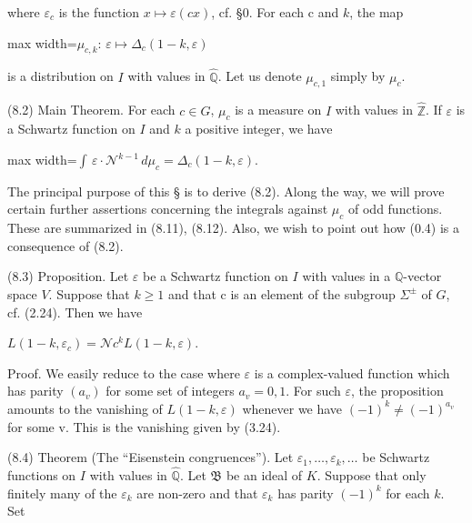 \documentclass[11pt]{article}
\newcommand{\DFormula}[1]{\par\smallskip\noindent\begin{adjustbox}{max width=\linewidth}$\displaystyle #1$\end{adjustbox}\par\smallskip}
\begin{document}
\par
where \(\varepsilon _{c}\) is the function \(x\mapsto \varepsilon (cx)\), cf. §0. For each c and \(k\), the map\par
\par
\DFormula{\mu _{c,k}:\,\varepsilon \mapsto \Delta _{c}(1-k,\varepsilon )}
\par
is a distribution on \(I\) with values in \(\widehat{\mathbb{Q}}\). Let us denote \(\mu _{c,1}\) simply by \(\mu _{c}\).\par
\par
(8.2) Main Theorem. For each \(c\in G\), \(\mu _{c}\) is a measure on \(I\) with values in \(\widehat{\mathbb{Z}}\). If \(\varepsilon \) is a Schwartz function on \(I\) and \(k\) a positive integer, we have\par
\par
\DFormula{\int \,\varepsilon \cdot \mathcal{N}^{k-1}\,d\mu _{c}=\Delta _{c}(1-k,\varepsilon ).}
\par
[Note that in the above equation, \(\mathcal{N}\) is the norm function \(I\to \widehat{\mathbb{Q}}.]\)\par
\par
The principal purpose of this § is to derive (8.2). Along the way, we will prove certain further assertions concerning the integrals against \(\mu _{c}\) of odd functions. These are summarized in (8.11), (8.12). Also, we wish to point out how (0.4) is a consequence of (8.2).\par
\par
(8.3) Proposition. Let \(\varepsilon \) be a Schwartz function on \(I\) with values in a \(\mathbb{Q}\)-vector space \(V\). Suppose that \(k\geq 1\) and that c is an element of the subgroup \(\Sigma ^{\pm }\) of \(G\), cf. (2.24). Then we have\par
\par
\(L(1-k,\varepsilon _{c})=\mathcal{N}c^{k}L(1-k,\varepsilon )\).\par
\par
Proof. We easily reduce to the case where \(\varepsilon \) is a complex-valued function which has parity \((a_{v})\) for some set of integers \(a_{v}=0,1\). For such \(\varepsilon \), the proposition amounts to the vanishing of \(L(1-k,\varepsilon )\) whenever we have \((-1)^{k}\neq (-1)^{a_{v}}\) for some v. This is the vanishing given by (3.24).\par
\par
(8.4) Theorem (The “Eisenstein congruences”). Let \(\varepsilon _{1},\ldots ,\varepsilon _{k},\ldots \) be Schwartz functions on \(I\) with values in \(\widehat{\mathbb{Q}}\). Let \(𝔅\) be an ideal of \(K\). Suppose that only finitely many of the \(\varepsilon _{k}\) are non-zero and that \(\varepsilon _{k}\) has parity \((-1)^{k}\) for each \(k\). Set\par
\end{document}
